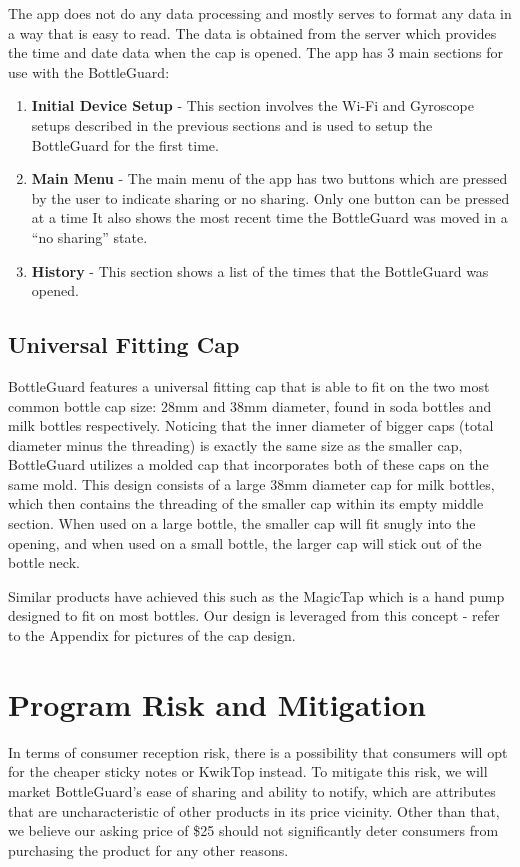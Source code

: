 \documentclass[12pt]{article}
\begin{document}
	The app does not do any data processing and mostly serves to format any data in a way that is easy to read. The data is obtained from the server which provides the time and date data when the cap is opened. The app has 3 main sections for use with the BottleGuard:
	
	\begin{enumerate}
		\item \textbf{Initial Device Setup} - This section involves the Wi-Fi and Gyroscope setups described in the previous sections and is used to setup the BottleGuard for the first time.
		\item \textbf{Main Menu} - The main menu of the app has two buttons which are pressed by the user to indicate sharing or no sharing. Only one button can be pressed at a time It also shows the most recent time the BottleGuard was moved in a “no sharing” state. 
		\item \textbf{History} - This section shows a list of the times that the BottleGuard was opened.
	\end{enumerate}
	
	\subsection*{Universal Fitting Cap}
	BottleGuard features a universal fitting cap that is able to fit on the two most common bottle cap size: 28mm and 38mm diameter, found in soda bottles and milk bottles respectively. Noticing that the inner diameter of bigger caps (total diameter minus the threading) is exactly the same size as the smaller cap, BottleGuard utilizes a molded cap that incorporates both of these caps on the same mold. This design consists of a large 38mm diameter cap for milk bottles, which then contains the threading of the smaller cap within its empty middle section. When used on a large bottle, the smaller cap will fit snugly into the opening, and when used on a small bottle, the larger cap will stick out of the bottle neck.
	
	Similar products have achieved this such as the MagicTap which is a hand pump designed to fit on most bottles. Our design is leveraged from this concept - refer to the Appendix for pictures of the cap design.
	
	\section*{Program Risk and Mitigation}
	In terms of consumer reception risk, there is a possibility that consumers will opt for the cheaper sticky notes or KwikTop instead. To mitigate this risk, we will market BottleGuard’s ease of sharing and ability to notify, which are attributes that are uncharacteristic of other products in its price vicinity. Other than that, we believe our asking price of \$25 should not significantly deter consumers from purchasing the product for any other reasons.
	
\end{document}
